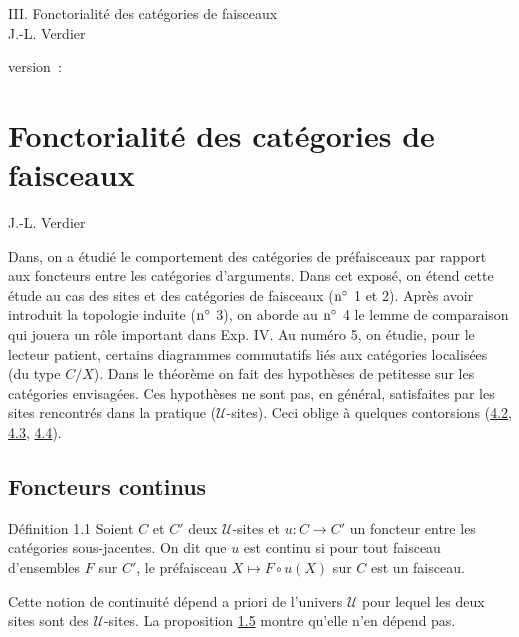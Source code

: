 \documentclass[10pt]{../fichiers-configuration-latex/smfart}
\begin{document}
\begin{center}
III. Fonctorialité des catégories de faisceaux\\
J.-L. Verdier
\end{center}

version : \showgitstatus{}
\tableofcontents

\else
\chapter{Fonctorialité des catégories de faisceaux}
\begin{center}
J.-L. Verdier
\end{center}
\fi

Dans\pageoriginale {}, on a étudié le comportement des catégories de
préfaisceaux par rapport aux foncteurs entre les catégories
d'arguments. Dans cet exposé, on étend cette étude au cas des sites
et des catégories de faisceaux (${\rm n^{\circ}}$ 1 et 2). Après
avoir introduit la topologie induite (${\rm n^{\circ}}$ 3), on
aborde au ${\rm n^{\circ}}$ 4 le lemme de comparaison qui jouera un
rôle important dans Exp. IV. Au numéro 5, on étudie, pour le
lecteur patient, certains diagrammes commutatifs liés aux catégories
localisées (du type $C/X$). Dans le théorème  on fait
des hypothèses de petitesse sur les catégories envisagées. Ces
hypothèses ne sont pas, en général, satisfaites par les sites
rencontrés dans la pratique ($𝒰$-sites). Ceci oblige à
quelques contorsions (\hyperref[III.subsec4.2]{4.2}, \hyperref[III.subsec4.3]{4.3},
\hyperref[III.subsec4.4]{4.4}).

\section{Foncteurs continus}

\begin{enonce*}{Définition 1.1}
Soient $C$ et $C'$ deux $𝒰$-sites et $u:C\rightarrow C'$ un
foncteur entre les catégories sous-jacentes. On dit que $u$ est
continu si pour tout faisceau d'ensembles $F$ sur $C'$, le
préfaisceau $X\mapsto F\circ u(X)$ sur $C$ est un faisceau.
\end{enonce*}

Cette notion de continuité dépend a priori de l'univers
$𝒰$ pour lequel les deux sites sont des $𝒰$-sites.
La proposition \hyperref[III.prop1.5]{1.5} montre qu'elle n'en dépend pas.
\end{document}
